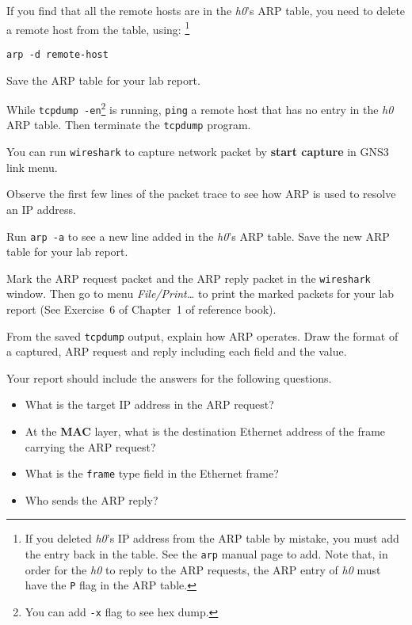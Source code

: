 \documentclass{../UTNetLab}
\begin{document}
    If you find that all the remote hosts are in the \textit{h0}’s ARP table, you need to delete a remote host from the table, using:
    \footnote{If you deleted \textit{h0}’s IP address from the ARP table by mistake, you must add the entry back in the table.
    See the \lstinline{arp} manual page to add.
    Note that, in order for the \textit{h0} to reply to the ARP requests, the ARP entry of \textit{h0} must have the \lstinline{P} flag in the ARP table.}
    \begin{lstlisting}[emph={remote-host}]
arp -d remote-host
    \end{lstlisting}

    Save the ARP table for your lab report.
    
    While \lstinline{tcpdump -en}\footnote{You can add \lstinline{-x} flag to see hex dump.} is running, \lstinline{ping} a remote host that has no entry in the \textit{h0} ARP table.
    Then terminate the \lstinline{tcpdump} program.

    You can run \lstinline{wireshark} to capture network packet by \textbf{start capture} in GNS3 link menu.

    Observe the first few lines of the packet trace to see how ARP is used to resolve an IP address.

    Run \lstinline{arp -a} to see a new line added in the \textit{h0}’s ARP table.
    Save the new ARP table for your lab report.

    Mark the ARP request packet and the ARP reply packet in the \lstinline{wireshark} window.
    Then go to menu \textit{File/Print\ldots} to print the marked packets for your lab report (See Exercise~6 of Chapter~1 of reference book).

    \begin{report}
        \item From the saved \lstinline{tcpdump} output, explain how ARP operates.
            Draw the format of a captured, ARP request and reply including each field and the value.
    \end{report}

    Your report should include the answers for the following questions.
    \begin{itemize}
        \item What is the target IP address in the ARP request?
        \item At the \textbf{MAC} layer, what is the destination Ethernet address of the frame carrying the ARP request?
        \item What is the \texttt{frame} type field in the Ethernet frame?
        \item Who sends the ARP reply?
    \end{itemize}
\end{document}
